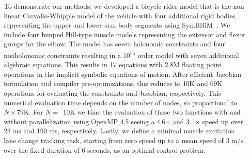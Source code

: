 \documentclass[11pt,twocolumn]{article}
\begin{document}
To demonstrate our methods, we developed a bicycle-rider model that is the
non-linear Carvallo-Whipple model of the vehicle with four additional rigid
bodies representing the upper and lower arm body segments using
SymBRiM~\cite{Stienstra2023a}. We include four lumped Hill-type muscle models
representing the extensor and flexor groups for the elbow. The model has seven
holonomic constraints and four nonholonomic constraints resulting in a
10\textsuperscript{th} order model with seven additional algebraic equations.
This results in 17 equations with 2.8M floating point operations in the implicit
symbolic equations of motion. After efficient Jacobian formulation and compiler
pre-optimizations, this reduces to 10K and 69K operations for evaluating the
constraints and Jacobian, respectively. This numerical evaluation time depends
on the number of nodes, so proportional to \(N\times\)79K. For \(N=\)~10K we
time the evaluation of these two functions with and without parallelization
using OpenMP 4.5 seeing a 4.6\(\times\) and 3.1\(\times\) speed up over 23 ms
and 190 ms, respectively. Lastly, we define a minimal muscle excitation lane
change tracking task, starting from zero speed up to a mean speed of 3 m/s over
the fixed duration of 6 seconds, as an optimal control problem.



\vspace{-1.5em}
\end{document}
